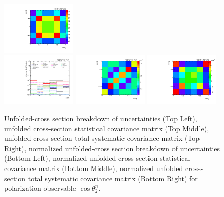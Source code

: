 \begin{refsection}
\begin{figure}[htb]
\begin{center}
 \includegraphics[width=0.32\textwidth]{fig_fullRun2UL/unfolding/combined/TotalSystCovMatrix_rebinnedB_b2n.pdf} \\
 \includegraphics[width=0.32\textwidth]{fig_fullRun2UL/unfolding/combined/deltaSystCombinedlogNorm_rebinnedB_b2n.pdf}
 \includegraphics[width=0.32\textwidth]{fig_fullRun2UL/unfolding/combined/StatCovMatrixNorm_rebinnedB_b2n.pdf}
 \includegraphics[width=0.32\textwidth]{fig_fullRun2UL/unfolding/combined/TotalSystCovMatrixNorm_rebinnedB_b2n.pdf} \\
\caption{Unfolded-cross section breakdown of uncertainties (Top Left), unfolded cross-section statistical covariance matrix (Top Middle), unfolded cross-section total systematic covariance matrix (Top Right), normalized unfolded-cross section breakdown of uncertainties (Bottom Left), normalized unfolded cross-section statistical covariance matrix (Bottom Middle), normalized unfolded cross-section total systematic covariance matrix (Bottom Right) for polarization observable $\cos\theta_{2}^{n}$.}
\label{fig:b2n_uncertainties}
\end{center}
\end{figure}
\clearpage
\begin{figure}[htb]
\begin{center}

\end{center}
\end{figure}
\end{refsection}
